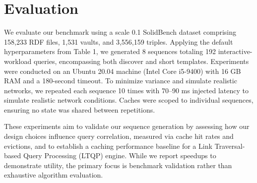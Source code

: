 \section{Evaluation}
We evaluate our benchmark using a scale 0.1 SolidBench dataset comprising 158,233 RDF files,
1,531 vaults, and 3,556,159 triples. Applying the default hyperparameters from Table 1,
we generated 8 sequences totaling 192 interactive-workload queries, encompassing both discover and short templates.
Experiments were conducted on an Ubuntu 20.04 machine (Intel Core i5-9400) with 16 GB RAM and a 180-second timeout.
To minimize variance and simulate realistic networks, we repeated each sequence 10 times with 70–90 ms injected latency 
to simulate realistic network conditions.
Caches were scoped to individual sequences, ensuring no state was shared between repetitions. 

These experiments aim to validate our sequence generation by assessing how our design choices influence 
query correlation, measured via cache hit rates and evictions, 
and to establish a caching performance baseline for a Link Traversal-based Query Processing (LTQP) engine.
While we report speedups to demonstrate utility, the primary focus is benchmark validation rather than exhaustive algorithm evaluation.  




